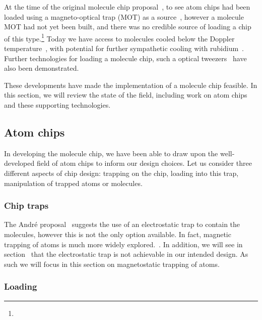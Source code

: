At the time of the original molecule chip proposal~\cite{Andre2006}, to see atom
chips had been loaded using a magneto-optical trap (MOT) as a
source~\cite{Reichel1999, Ott2001}, however a molecule MOT had not yet been
built, and there was no credible source of loading a chip of this
type.\footnote{}
%
Today we have access to molecules cooled below the Doppler
temperature~\cite{Truppe2017}, with potential for further sympathetic cooling
with rubidium~. Further technologies for loading a
molecule chip, such a optical tweezers~\cite{Liueaar7797} have also been
demonstrated.

These developments have made the implementation of a molecule chip feasible. In
this section, we will review the state of the field, including work on atom
chips and these supporting technologies.

\subsection{Atom chips}


In developing the molecule chip, we have been able to draw upon the
well-developed field of atom chips to inform our design choices. Let us consider
three different aspects of chip design: trapping on the chip, loading into this
trap, manipulation of trapped atoms or molecules.

\subsubsection{Chip traps}

The Andr\'e proposal~\cite{Andre2006} suggests the use of an electrostatic trap
to contain the molecules, however this is not the only option available. In
fact, magnetic trapping of atoms is much more widely explored.~\cite{2011Ac}.
 In addition, we will see in section~%
that the electrostatic trap is not achievable in our intended design. As such we
will focus in this section on magnetostatic trapping of atoms.


\subsubsection{Loading}

